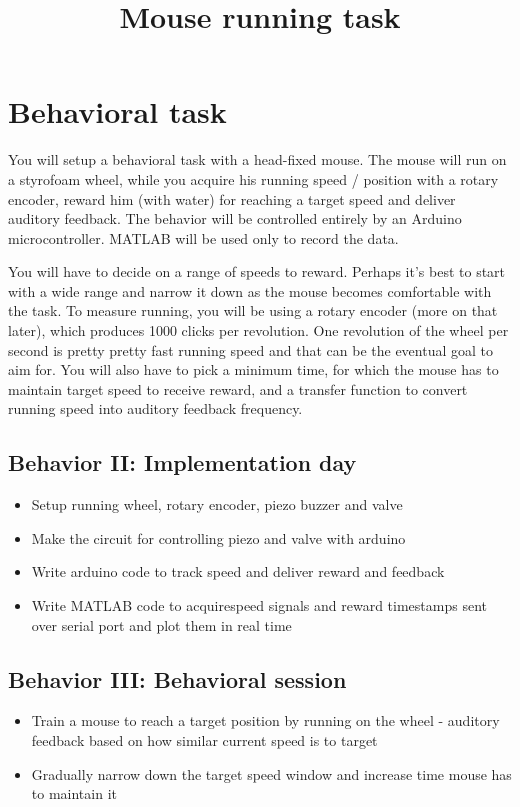 \documentclass[a4paper,10pt]{article}
\title{Mouse running task}
\author{}
\date{}
\begin{document}
\maketitle
\section{Behavioral task}
You will setup a behavioral task with a head-fixed mouse. The mouse will run on a styrofoam wheel, 
while you acquire his running speed / position with a rotary encoder, reward him (with water) for 
reaching a target speed and deliver auditory feedback. The behavior will be controlled entirely
by an Arduino microcontroller. MATLAB will be used only to record the data.

You will have to decide on a range of speeds to reward. Perhaps it's best to start with a wide range
and narrow it down as the mouse becomes comfortable with the task. To measure running, you will be using a rotary encoder
 (more on that later), which produces 1000 clicks per revolution. One revolution of the wheel per second 
 is pretty pretty fast running speed and that can be the eventual goal to aim for. You will also 
 have to pick a minimum time, for which the mouse has to maintain target speed to receive reward, 
and a transfer function to convert running speed into auditory feedback frequency.

\subsection{Behavior II: Implementation day}
\begin{itemize}
 \item Setup running wheel, rotary encoder, piezo buzzer and valve
 \item Make the circuit for controlling piezo and valve with arduino
 \item Write arduino code to track speed and deliver reward and feedback
 \item Write MATLAB code to acquirespeed signals and reward timestamps sent over serial port
 and plot them in real time
\end{itemize}

\subsection{Behavior III: Behavioral session}
\begin{itemize}
 \item Train a mouse to reach a target position by running on the wheel - auditory feedback based on how similar
 current speed is to target
 \item Gradually narrow down the target speed window and increase time mouse has to maintain it
\end{itemize}
\pagebreak
\end{document}
